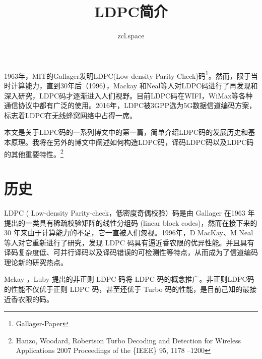 \documentclass[10pt,a4paper,UTF8]{article}
\author{zcl.space}
\date{}
\title{LDPC简介}
\begin{document}
\maketitle
\tableofcontents
{}
1963年，MIT的Gallager发明LDPC(Low-density-Parity-Check)码\footnote{Gallager-Paper}。然而，限于当时计算能力，直到30年后（1996），Mackay 和Neal等人对LDPC码进行了再发现和深入研究，LDPC码才逐渐进入人们视野。目前LDPC码在WIFI，WiMax等各种通信协议中都有广泛的使用。2016年，LDPC被3GPP选为5G数据信道编码方案，标志着LDPC在无线蜂窝网络中占得一席。

本文是关于LDPC码的一系列博文中的第一篇，简单介绍LDPC码的发展历史和基本原理。我将在另外的博文中阐述如何构造LDPC码，译码LDPC码以及LDPC码的其他重要特性。\footnote{Hanzo, Woodard, Robertson   Turbo Decoding and Detection for Wireless Applications     2007 Proceedings of the \{IEEE\} 95, 1178 --1200}





\section{历史}
\label{sec:org9c4bdcc}


LDPC ( Low-density Parity-check，低密度奇偶校验）码是由 Gallager 在1963 年提出的一类具有稀疏校验矩阵的线性分组码 (linear block codes)，然而在接下来的 30 年来由于计算能力的不足，它一直被人们忽视。1996年，D MacKay、M Neal 等人对它重新进行了研究，发现 LDPC 码具有逼近香农限的优异性能。并且具有译码复杂度低、可并行译码以及译码错误的可检测性等特点，从而成为了信道编码理论新的研究热点。

Mckay ，Luby 提出的非正则 LDPC 码将 LDPC 码的概念推广。非正则LDPC码 的性能不仅优于正则 LDPC 码，甚至还优于 Turbo 码的性能，是目前己知的最接近香农限的码。
\end{document}
